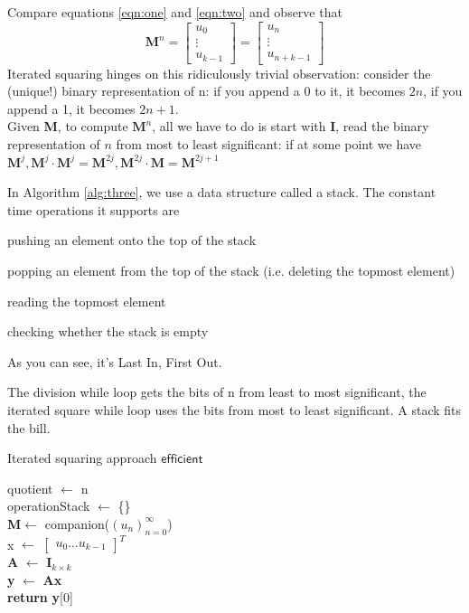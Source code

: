 \documentclass[answers]{exam}
\theoremstyle{definition}
\newcommand{\term}[0]{(u_n)_{n=0}^\infty}
\newcommand{\M}[0]{\textbf{M}}
\begin{document}
Compare equations \ref{eqn:one} and \ref{eqn:two} and observe that
\begin{equation}
    \M^n = \begin{bmatrix} u_0 \\ \vdots \\ u_{k-1}\end{bmatrix}
    = \begin{bmatrix} u_n \\ \vdots \\ u_{n+k-1}\end{bmatrix}
\end{equation} 
Iterated squaring hinges on this ridiculously trivial observation: consider the (unique!) binary representation of n:  if you append a 0 to it, it becomes $2n$, if you append a 1, it becomes $2n + 1$. \\
Given \M, to compute $\M^n$, all we have to do is start with \textbf{I}, read the binary representation of $n$ from
most to least significant: if at some point we have $\M^j, \M^j \cdot\M^j = \M^{2j} , \M^{2j}\cdot\M = \M^{2j+1}$ 

In Algorithm \ref{alg:three}, we use a data structure called a stack. The constant time operations it supports are

\begin{compactitem}
    \item pushing an element onto the top of the stack
    \item popping an element from the top of the stack (i.e. deleting the topmost element)
    \item reading the topmost element
    \item checking whether the stack is empty
\end{compactitem}
As you can see, it's Last In, First Out.

The division while loop gets the bits of n from least to most significant, the iterated square while loop uses the bits from most to least significant. A stack fits the bill.
\begin{algorithm}
\caption{Iterated squaring approach $\mathsf{efficient}$}\label{alg:three}
\KwData{LRS $\term, n$}
quotient $\leftarrow$ n \\
operationStack  $\leftarrow$ \{\} \\
\M $\leftarrow$   companion($\term$) \\
x $\leftarrow$ $\begin{bmatrix} u_0 \ldots u_{k-1} \end{bmatrix}^T$ \\
\textbf{A} $\leftarrow$ \textbf{I}$_{k\times k}$ \\
\textbf{y} $\leftarrow$ \textbf{Ax} \\
\textbf{return} \textbf{y}[0]

\end{algorithm}
\end{document}
